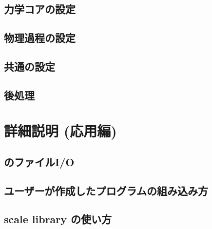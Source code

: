 \documentclass[a4paper]{jreport}
\begin{document}
 \chapter{力学コアの設定}


 \chapter{物理過程の設定} \label{sec:basic_usel_physics}
 

 \chapter{共通の設定}


 \chapter{後処理} \label{sec:basic_usel_post}
 

 \part{詳細説明 (応用編)} \label{part:advance}
 \chapter{\scalelib のファイルI/O}
 

 \chapter{ユーザーが作成したプログラムの組み込み方}
 \chapter{scale library  の使い方}
\end{document}
